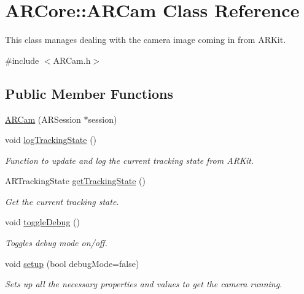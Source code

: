 \hypertarget{class_a_r_core_1_1_a_r_cam}{}\section{A\+R\+Core\+:\+:A\+R\+Cam Class Reference}
\label{class_a_r_core_1_1_a_r_cam}


This class manages dealing with the camera image coming in from A\+R\+Kit.  




{\ttfamily \#include $<$A\+R\+Cam.\+h$>$}

\subsection*{Public Member Functions}
\begin{DoxyCompactItemize}
\item 
\hyperlink{class_a_r_core_1_1_a_r_cam_aac3da0758960b1cc5787eae0b7efffe1}{A\+R\+Cam} (A\+R\+Session $\ast$session)
\item 
void \hyperlink{class_a_r_core_1_1_a_r_cam_aea3513907e5805e6bffb08b7d65c0fc7}{log\+Tracking\+State} ()
\begin{DoxyCompactList}\small\item\em Function to update and log the current tracking state from A\+R\+Kit. \end{DoxyCompactList}\item 
A\+R\+Tracking\+State \hyperlink{class_a_r_core_1_1_a_r_cam_abef41c0e5914cb2404b26317921d16a1}{get\+Tracking\+State} ()
\begin{DoxyCompactList}\small\item\em Get the current tracking state. \end{DoxyCompactList}\item 
void \hyperlink{class_a_r_core_1_1_a_r_cam_ad32236d8551ac38943f088f16afb8002}{toggle\+Debug} ()
\begin{DoxyCompactList}\small\item\em Toggles debug mode on/off. \end{DoxyCompactList}\item 
void \hyperlink{class_a_r_core_1_1_a_r_cam_a5abe4cdd0ae36986899afaeae16c6bf2}{setup} (bool debug\+Mode=false)
\begin{DoxyCompactList}\small\item\em Sets up all the necessary properties and values to get the camera running. \end{DoxyCompactList}\item 

\end{DoxyCompactItemize}
